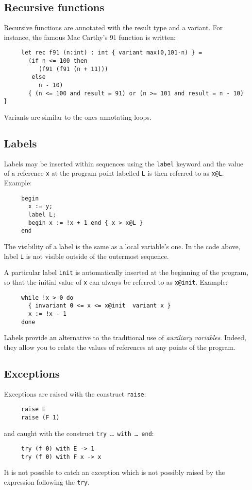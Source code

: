 \documentclass[a4paper,12pt]{report}
\makeatletter
\newcommand{\te}[1]{\texttt{#1}}
\newcommand{\indextt}[1]{\index{#1@\texttt{#1}}}
\makeatother
\begin{document}
\subsection{Recursive functions}
Recursive functions are annotated with the result type and a variant.
For instance, the famous Mac Carthy's 91 function is written:
\begin{verbatim}
     let rec f91 (n:int) : int { variant max(0,101-n) } =
       (if n <= 100 then
          (f91 (f91 (n + 11)))
        else
          n - 10)
       { (n <= 100 and result = 91) or (n >= 101 and result = n - 10) }
\end{verbatim}
Variants are similar to the ones annotating loops.

\subsection{Labels}
Labels may be inserted within sequences using the 
\te{label} keyword and the value of a reference \texttt{x} at the
program point labelled \texttt{L} is then referred to as \texttt{x@L}.
Example:
\begin{verbatim}
     begin 
       x := y;
       label L; 
       begin x := !x + 1 end { x > x@L }
     end
\end{verbatim}
The visibility of a label is the same as a local variable's one. In
the code above, label \texttt{L} is not visible outside of the
outermost sequence.

\indextt{init}
A particular label \texttt{init} is automatically inserted at the
beginning of the program, so that the initial value of \texttt{x}
can always be referred to as \texttt{x@init}. 
Example:
\begin{verbatim}
     while !x > 0 do 
       { invariant 0 <= x <= x@init  variant x } 
       x := !x - 1 
     done
\end{verbatim}

Labels provide an alternative to the traditional use of
\emph{auxiliary variables}. Indeed, they
allow you to relate the values of references at any points of the
program. 


\subsection{Exceptions}
\label{exception}

Exceptions are raised with the construct \texttt{raise}:
\begin{verbatim}
     raise E
     raise (F 1)
\end{verbatim}
and caught with the construct \texttt{try \dots\ with \dots\ end}:
\begin{verbatim}
     try (f 0) with E -> 1
     try (f 0) with F x -> x
\end{verbatim}
It is not possible to catch an exception which is not possibly raised
by the expression following the \texttt{try}.
\end{document}
